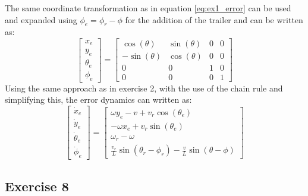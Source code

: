 The same coordinate transformation as in equation \eqref{eq:ex1_error} can be used and expanded using $\phi_e = \phi_r - \phi$ for the addition of the trailer and can be written as:
\begin{equation}
    \begin{bmatrix}
    x_e \\
    y_e \\
    \theta_e \\
    \phi_e
    \end{bmatrix}
    =
    \begin{bmatrix}
    \cos(\theta) & \sin(\theta) & 0 & 0 \\
    -\sin(\theta) & \cos(\theta) & 0 & 0 \\
    0 & 0 & 1 & 0 \\
    0 & 0 & 0 & 1
    \end{bmatrix}
    \label{eq:ex7_error}
\end{equation}
Using the same approach as in exercise 2, with the use of the chain rule and simplifying this, the error dynamics can written as:
\begin{equation}
    \begin{bmatrix}
    \dot{x}_e \\
    \dot{y}_e \\
    \dot{\theta}_e \\
    \dot{\phi}_e
    \end{bmatrix}
    =
    \begin{bmatrix}
    \omega y_e - v + v_r \cos(\theta_e) \\
    -\omega x_e + v_r \sin(\theta_e) \\
    \omega_r - \omega \\
    \frac{v_r}{L} \sin(\theta_r - \phi_r) - \frac{v}{L} \sin(\theta - \phi)
    \end{bmatrix}
    \label{eq:ex7_errordyn}
\end{equation}


\subsection{Exercise 8}

